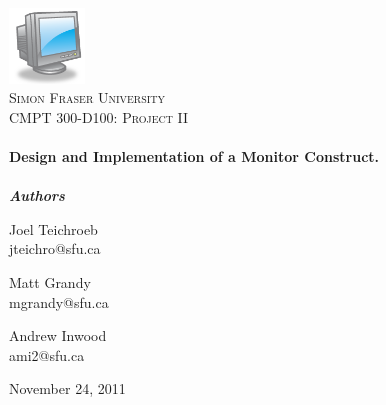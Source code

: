 \begin{titlepage}

\begin{center}


\includegraphics[width=0.15\textwidth]{./logo}\\[1cm]    

\textsc{\LARGE Simon Fraser University}\\[1.5cm]

\textsc{\Large CMPT 300-D100: Project II}\\[0.5cm]


\HRule \\[0.4cm]
{ \huge \bfseries Design and Implementation of a Monitor Construct. }\\[0.4cm]

\HRule \\[1.5cm]
{ \large \bfseries \emph{Authors}}\\[1cm]

\begin{minipage}{0.26\textwidth}
\begin{flushleft} \large
Joel Teichroeb\\
jteichro@sfu.ca
\end{flushleft}
\end{minipage}
\begin{minipage}{0.26\textwidth}
\centering
\large
Matt Grandy\\
mgrandy@sfu.ca
\end{minipage}
\begin{minipage}{0.26\textwidth}
\begin{flushright} \large
Andrew Inwood\\
ami2@sfu.ca
\end{flushright}
\end{minipage}

\vfill

{\large November 24, 2011}

\end{center}

\end{titlepage}
